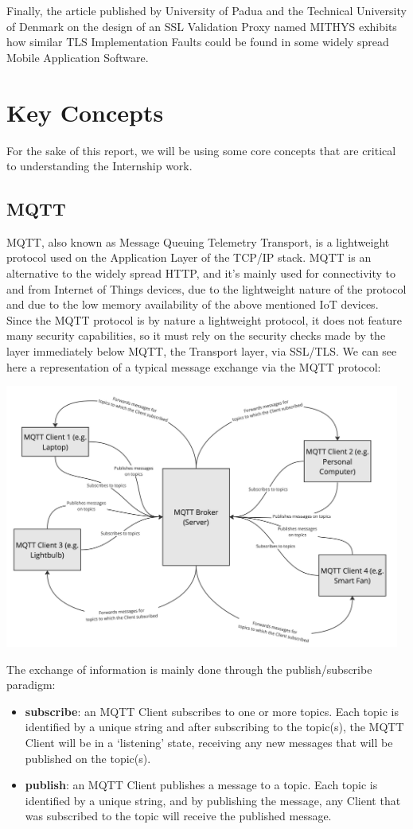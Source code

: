 \documentclass[binding=0.6cm,noexaminfo]{sapthesis}
\begin{document}
Finally, the article published by University of Padua and the Technical University of Denmark on the design of an SSL Validation Proxy named MITHYS \cite{mithys} exhibits how similar TLS Implementation Faults could be found in some widely spread Mobile Application Software.

\section{Key Concepts}
For the sake of this report, we will be using some core concepts that are critical to understanding the Internship work.

\subsection{MQTT}
MQTT, also known as Message Queuing Telemetry Transport, is a lightweight protocol used on the Application Layer of the TCP/IP stack. MQTT is an alternative to the widely spread HTTP, and it’s mainly used for connectivity to and from Internet of Things devices, due to the lightweight nature of the protocol and due to the low memory availability of the above mentioned IoT devices.
Since the MQTT protocol is by nature a lightweight protocol, it does not feature many security capabilities, so it must rely on the security checks made by the layer immediately below MQTT, the Transport layer, via SSL/TLS.
We can see here a representation of a typical message exchange via the MQTT protocol:

\includegraphics[width=13cm]{MQTT}

The exchange of information is mainly done through the publish/subscribe paradigm:
\begin{itemize}
	\item \textbf{subscribe}: an MQTT Client subscribes to one or more topics. Each topic is identified by a unique string and after subscribing to the topic(s), the MQTT Client will be in a `listening' state, receiving any new messages that will be published on the topic(s).
	\item \textbf{publish}: an MQTT Client publishes a message to a topic. Each topic is identified by a unique string, and by publishing the message, any Client that was subscribed to the topic will receive the published message.
\end{itemize}
\end{document}
